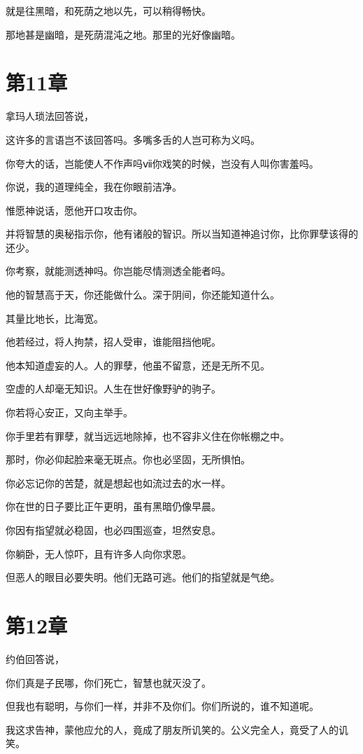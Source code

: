 \documentclass[12pt,oneside]{book}
\begin{document}
就是往黑暗，和死荫之地以先，可以稍得畅快。

那地甚是幽暗，是死荫混沌之地。那里的光好像幽暗。



\chapter{第11章}
拿玛人琐法回答说，

这许多的言语岂不该回答吗。多嘴多舌的人岂可称为义吗。

你夸大的话，岂能使人不作声吗ⅶ你戏笑的时候，岂没有人叫你害羞吗。

你说，我的道理纯全，我在你眼前洁净。

惟愿神说话，愿他开口攻击你。

并将智慧的奥秘指示你，他有诸般的智识。所以当知道神追讨你，比你罪孽该得的还少。

你考察，就能测透神吗。你岂能尽情测透全能者吗。

他的智慧高于天，你还能做什么。深于阴间，你还能知道什么。

其量比地长，比海宽。

他若经过，将人拘禁，招人受审，谁能阻挡他呢。

他本知道虚妄的人。人的罪孽，他虽不留意，还是无所不见。

空虚的人却毫无知识。人生在世好像野驴的驹子。

你若将心安正，又向主举手。

你手里若有罪孽，就当远远地除掉，也不容非义住在你帐棚之中。

那时，你必仰起脸来毫无斑点。你也必坚固，无所惧怕。

你必忘记你的苦楚，就是想起也如流过去的水一样。

你在世的日子要比正午更明，虽有黑暗仍像早晨。

你因有指望就必稳固，也必四围巡查，坦然安息。

你躺卧，无人惊吓，且有许多人向你求恩。

但恶人的眼目必要失明。他们无路可逃。他们的指望就是气绝。



\chapter{第12章}
约伯回答说，

你们真是子民哪，你们死亡，智慧也就灭没了。

但我也有聪明，与你们一样，并非不及你们。你们所说的，谁不知道呢。

我这求告神，蒙他应允的人，竟成了朋友所讥笑的。公义完全人，竟受了人的讥笑。
\end{document}
